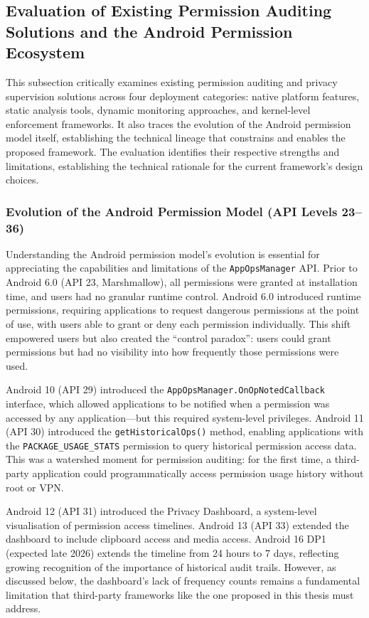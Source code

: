\subsection{Evaluation of Existing Permission Auditing Solutions and the Android Permission Ecosystem}
This subsection critically examines existing permission auditing and privacy supervision solutions across four deployment categories: native platform features, static analysis tools, dynamic monitoring approaches, and kernel-level enforcement frameworks. It also traces the evolution of the Android permission model itself, establishing the technical lineage that constrains and enables the proposed framework. The evaluation identifies their respective strengths and limitations, establishing the technical rationale for the current framework's design choices.

\subsubsection{Evolution of the Android Permission Model (API Levels 23–36)}
Understanding the Android permission model's evolution is essential for appreciating the capabilities and limitations of the \texttt{AppOpsManager} API. Prior to Android 6.0 (API 23, Marshmallow), all permissions were granted at installation time, and users had no granular runtime control. Android 6.0 introduced runtime permissions, requiring applications to request dangerous permissions at the point of use, with users able to grant or deny each permission individually. This shift empowered users but also created the ``control paradox'': users could grant permissions but had no visibility into how frequently those permissions were used.

Android 10 (API 29) introduced the \texttt{AppOpsManager.OnOpNotedCallback} interface, which allowed applications to be notified when a permission was accessed by any application—but this required system-level privileges. Android 11 (API 30) introduced the \texttt{getHistoricalOps()} method, enabling applications with the \texttt{PACKAGE\_USAGE\_STATS} permission to query historical permission access data. This was a watershed moment for permission auditing: for the first time, a third-party application could programmatically access permission usage history without root or VPN.

Android 12 (API 31) introduced the Privacy Dashboard, a system-level visualisation of permission access timelines. Android 13 (API 33) extended the dashboard to include clipboard access and media access. Android 16 DP1 (expected late 2026) extends the timeline from 24 hours to 7 days, reflecting growing recognition of the importance of historical audit trails. However, as discussed below, the dashboard's lack of frequency counts remains a fundamental limitation that third-party frameworks like the one proposed in this thesis must address.

